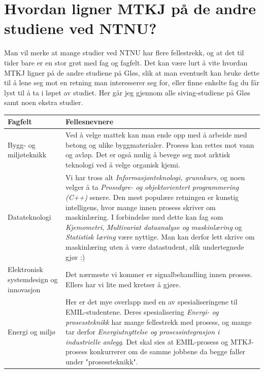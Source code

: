\section{Hvordan ligner MTKJ på de andre studiene ved NTNU?}

Man vil merke at mange studier ved NTNU har flere fellestrekk, og at det til tider bare er en stor grøt med fag og fagfelt. Det kan være lurt å vite hvordan MTKJ ligner på de andre studiene på Gløs, slik at man eventuelt kan bruke dette til å lene seg mot en retning man interesserer seg for, eller finne enkelte fag du får lyst til å ta i løpet av studiet. Her går jeg gjennom alle siving-studiene på Gløs samt noen ekstra studier. 

\begin{table}[H]
    \centering
    \begin{tabular}{p{3cm}p{10cm}}
        \toprule
        Fagfelt & Fellesnevnere \\
        \midrule
        Bygg- og miljøteknikk & Ved å velge mattek kan man ende opp med å arbeide med betong og ulike byggmaterialer. Prosess kan rettes mot vann og avløp. Det er også mulig å bevege seg mot arktisk teknologi ved å velge organisk kjemi. \\
        
        Datateknologi & Vi har tross alt \textit{Informasjonteknologi, grunnkurs}, og noen velger å ta \textit{Prosedyre- og objektorientert programmering (C++)} senere. Den mest populære retningen er kunstig intelligens, hvor mange innen prosess skriver om maskinlæring. I forbindelse med dette kan fag som \textit{Kjemometri}, \textit{Multivariat dataanalyse og maskinlæring} og \textit{Statistisk læring} være nyttige. Man kan derfor lett skrive om maskinlæring uten å være datastudent, slik undertegnede gjør :) \\
        
        Elektronisk systemdesign og innovasjon & Det nærmeste vi kommer er signalbehandling innen prosess. Ellers har vi lite med kretser å gjøre. \\
        
        Energi og miljø & Her er det mye overlapp med en av spesialiseringene til EMIL-studentene. Deres spesialisering \textit{Energi- og prosessteknikk} har mange fellestrekk med prosess, og mange tar derfor \textit{Energiutnyttelse og prosessintegrasjon i industrielle anlegg}. Det skal sies at EMIL-prosess og MTKJ-prosess konkurrerer om de samme jobbene da begge faller under "prosessteknikk". \\
        

\end{tabular}
\end{table}
